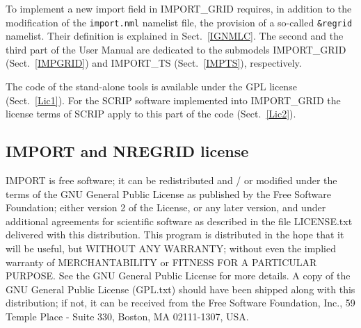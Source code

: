 \documentclass[11pt,twoside]{report}
\begin{document}
To implement a new import field in IMPORT\_GRID  requires, in addition to the
modification of the \verb|import.nml| namelist file, the provision of
a so-called 
\verb|&regrid| namelist. Their definition is explained in Sect.~\ref{IGNMLC}.
The second and the third part of the User Manual are dedicated to the submodels
 IMPORT\_GRID (Sect.~\ref{IMPGRID}) and  IMPORT\_TS (Sect.~\ref{IMPTS}),
respectively.

The code of the stand-alone tools is available under the GPL license 
(Sect.~\ref{Lic1}). For the SCRIP software \citep{Jones99}
implemented into IMPORT\_GRID the license terms of
SCRIP apply to this part of the code (Sect.~\ref{Lic2}).

\subsection{IMPORT and NREGRID license\label{Lic1}} 
IMPORT is free software; it can be redistributed and / or modified under the
terms of the GNU General Public License as published by the Free Software 
Foundation; either version 2 of the License, or any later version, and under 
additional
agreements for scientific software as described in the file LICENSE.txt
 delivered with this distribution.
This program is distributed in the hope that it will be useful, but WITHOUT
ANY WARRANTY; without even the implied warranty of MERCHANTABILITY or FITNESS
 FOR A PARTICULAR PURPOSE. See the GNU General Public
License for more details.
A copy of the GNU General Public License (GPL.txt) should have been shipped
along with this distribution; if not, it can be received from the Free Software Foundation, Inc., 59 Temple Place - Suite 330, Boston, MA 02111-1307, USA.
\clearpage
\end{document}
